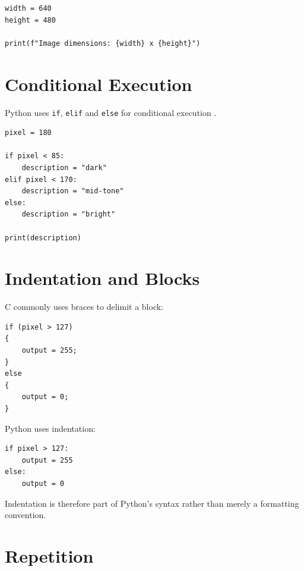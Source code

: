 \begin{verbatim}
width = 640
height = 480

print(f"Image dimensions: {width} x {height}")
\end{verbatim}


\section{Conditional Execution}
\label{sec:python-conditionals}

Python uses \texttt{if},
\texttt{elif} and
\texttt{else} for conditional execution
\cite{python_control_flow}.

\begin{listing}[htbp]
    \caption{Classifying a greyscale pixel.}
    \label{lst:classify-pixel}

\begin{verbatim}
pixel = 180

if pixel < 85:
    description = "dark"
elif pixel < 170:
    description = "mid-tone"
else:
    description = "bright"

print(description)
\end{verbatim}

\end{listing}


\section{Indentation and Blocks}
\label{sec:python-indentation}

C commonly uses braces to delimit a block:

\begin{verbatim}
if (pixel > 127)
{
    output = 255;
}
else
{
    output = 0;
}
\end{verbatim}

Python uses indentation:

\begin{verbatim}
if pixel > 127:
    output = 255
else:
    output = 0
\end{verbatim}

Indentation is therefore part of Python's syntax rather than merely a
formatting convention.


\section{Repetition}
\label{sec:python-repetition}

